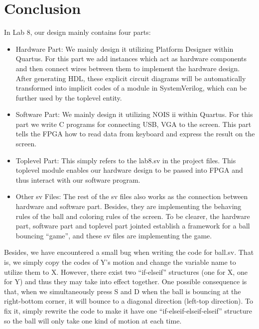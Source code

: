 \documentclass[11pt]{article}
\begin{document}
\section{Conclusion}
In Lab 8, our design mainly contains four parts:
\begin{itemize}
\item Hardware Part: We mainly design it utilizing Platform Designer within Quartus. For this part we add instances which act as hardware components and then connect wires between them to implement the hardware design. After generating HDL, these explicit circuit diagrams will be automatically transformed into implicit codes of a module in SystemVerilog, which can be further used by the toplevel entity.
\item Software Part: We mainly design it utilizing NOIS ii within Quartus. For this part we write C programs for connecting USB, VGA to the screen. This part tells the FPGA how to read data from keyboard and express the result on the screen.
\item Toplevel Part: This simply refers to the lab8.sv in the project files. This toplevel module enables our hardware design to be passed into FPGA and thus interact with our software program.
\item Other sv Files: The rest of the sv files also works as the connection between hardware and software part. Besides, they are implementing the behaving rules of the ball and coloring rules of the screen. To be clearer, the hardware part, software part and toplevel part jointed establish a framework for a ball bouncing “game”, and these sv files are implementing the game.
\end{itemize}

Besides, we have encountered a small bug when writing the code for ball.sv. That is, we simply copy the codes of Y’s motion and change the variable name to utilize them to X. However, there exist two “if-elseif” structures (one for X, one for Y) and thus they may take into effect together. One possible consequence is that, when we simultaneously press S and D when the ball is bouncing at the right-bottom corner, it will bounce to a diagonal direction (left-top direction). To fix it, simply rewrite the code to make it have one “if-elseif-elseif-elseif” structure so the ball will only take one kind of motion at each time. 


\end{document}
